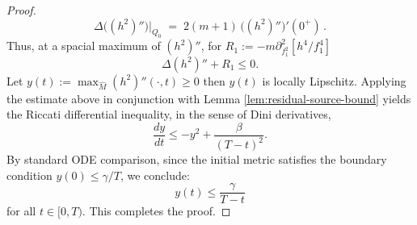 \documentclass[10pt,a4paper]{amsart}
\begin{document}
\begin{proof}
	\[
	\Delta \big( ( h^2 )'' \big) \Big|_{Q_0} \;=\; 2 ( m + 1 )\, \big( ( h^2 )'' \big)' ( 0^+ ) \,.
	\]
	Thus, at a spacial maximum of $(h^2)''$, for $R_1 := -m \partial^2_{f_1^2}[ h^4/f_1^4 ]$
	\[\Delta(h^2)''+R_1\leq 0. \]
	Let $y(t) := \max_{\widehat{M}} (h^2)''(\cdot, t) \ge 0$ then  $y (t)$ is locally Lipschitz. Applying the estimate above in conjunction with Lemma \ref{lem:residual-source-bound}
	yields the Riccati differential inequality, in the sense of Dini derivatives,
	\begin{equation*}
		\frac{dy}{dt} \le -y^2 + \frac{\beta}{(T-t)^2}.
	\end{equation*}
	By standard ODE comparison, since the initial metric satisfies the boundary condition $y(0) \le \gamma / T$, we conclude:
	\begin{equation}
		y(t) \le \frac{\gamma}{T - t}
	\end{equation}
	for all $t \in [0, T)$. This completes the proof.
\end{proof}
\end{document}
